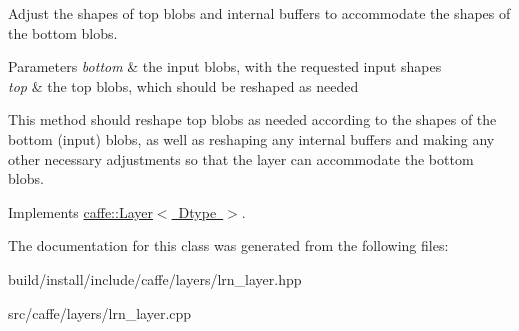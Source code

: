 Adjust the shapes of top blobs and internal buffers to accommodate the shapes of the bottom blobs. 


\begin{DoxyParams}{Parameters}
{\em bottom} & the input blobs, with the requested input shapes \\
\hline
{\em top} & the top blobs, which should be reshaped as needed\\
\hline
\end{DoxyParams}
This method should reshape top blobs as needed according to the shapes of the bottom (input) blobs, as well as reshaping any internal buffers and making any other necessary adjustments so that the layer can accommodate the bottom blobs. 

Implements \mbox{\hyperlink{classcaffe_1_1_layer_a7fe981e8af8d93d587acf2a952be563d}{caffe\+::\+Layer$<$ Dtype $>$}}.



The documentation for this class was generated from the following files\+:\begin{DoxyCompactItemize}
\item 
build/install/include/caffe/layers/lrn\+\_\+layer.\+hpp\item 
src/caffe/layers/lrn\+\_\+layer.\+cpp\end{DoxyCompactItemize}
